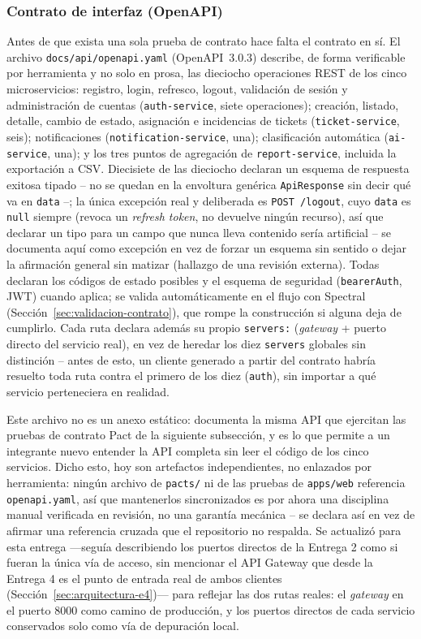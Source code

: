 \subsubsection{Contrato de interfaz (OpenAPI)}
\label{sec:contrato-openapi}

Antes de que exista una sola prueba de contrato hace falta el contrato en sí. El archivo
\texttt{docs/api/openapi.yaml} (OpenAPI~3.0.3) describe, de forma verificable por herramienta y no
solo en prosa, las dieciocho operaciones REST de los cinco microservicios: registro, login,
refresco, logout, validación de sesión y administración de cuentas (\texttt{auth-service}, siete
operaciones); creación, listado, detalle, cambio de estado, asignación e incidencias de tickets
(\texttt{ticket-service}, seis); notificaciones (\texttt{notification-service}, una);
clasificación automática (\texttt{ai-service}, una); y los tres puntos de agregación de
\texttt{report-service}, incluida la exportación a CSV. Diecisiete de las dieciocho declaran un
esquema de respuesta exitosa tipado -- no se quedan en la envoltura genérica
\texttt{ApiResponse} sin decir qué va en \texttt{data} --; la única excepción real y deliberada
es \texttt{POST /logout}, cuyo \texttt{data} es \texttt{null} siempre (revoca un \emph{refresh
token}, no devuelve ningún recurso), así que declarar un tipo para un campo que nunca lleva
contenido sería artificial -- se documenta aquí como excepción en vez de forzar un esquema sin
sentido o dejar la afirmación general sin matizar (hallazgo de una revisión externa). Todas
declaran los códigos de estado posibles y el esquema de seguridad (\texttt{bearerAuth}, JWT)
cuando aplica; se valida automáticamente en el
flujo con Spectral (Sección~\ref{sec:validacion-contrato}), que rompe la construcción si alguna
deja de cumplirlo. Cada ruta declara además su propio \texttt{servers:} (\emph{gateway} +
puerto directo del servicio real), en vez de heredar los diez \texttt{servers} globales sin
distinción -- antes de esto, un cliente generado a partir del contrato habría resuelto toda ruta
contra el primero de los diez (\texttt{auth}), sin importar a qué servicio perteneciera en
realidad.

Este archivo no es un anexo estático: documenta la misma API que ejercitan las pruebas de
contrato Pact de la siguiente subsección, y es lo que permite a un integrante nuevo entender la
API completa sin leer el código de los cinco servicios. Dicho esto, hoy son artefactos
independientes, no enlazados por herramienta: ningún archivo de \texttt{pacts/} ni de las
pruebas de \texttt{apps/web} referencia \texttt{openapi.yaml}, así que mantenerlos sincronizados
es por ahora una disciplina manual verificada en revisión, no una garantía mecánica -- se
declara así en vez de afirmar una referencia cruzada que el repositorio no respalda. Se
actualizó para esta entrega —seguía describiendo los puertos directos de la Entrega 2 como si
fueran la única vía de acceso, sin mencionar el API Gateway que desde la Entrega 4 es el punto de
entrada real de ambos clientes (Sección~\ref{sec:arquitectura-e4})— para reflejar las dos rutas
reales: el \emph{gateway} en el puerto 8000 como camino de producción, y los puertos directos de
cada servicio conservados solo como vía de depuración local.

